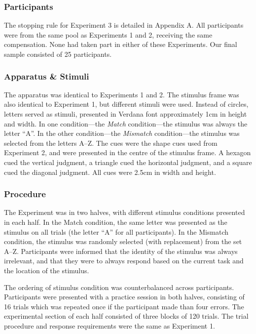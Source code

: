 \documentclass[a4paper, doc, natbib]{apa6}
\begin{document}
\subsubsection{Participants}
The stopping rule for Experiment 3 is detailed in Appendix A. All participants were from the same pool as Experiments 1 and 2, receiving the same compensation. None had taken part in either of these Experiments. Our final sample consisted of 25 participants.

\subsubsection{Apparatus \& Stimuli}
The apparatus was identical to Experiments 1 and 2. The stimulus frame was also identical to Experiment 1, but different stimuli were used. Instead of circles, letters served as stimuli, presented in Verdana font approximately 1cm in height and width. In one condition---the \emph{Match} condition---the stimulus was always the letter ``A''. In the other condition---the \emph{Mismatch} condition---the stimulus was selected from the letters A--Z. The cues were the shape cues used from Experiment 2, and were presented in the centre of the stimulus frame. A hexagon cued the vertical judgment, a triangle cued the horizontal judgment, and a square cued the diagonal judgment. All cues were 2.5cm in width and height.


\subsubsection{Procedure}
The Experiment was in two halves, with different stimulus conditions presented in each half. In the Match condition, the same letter was presented as the stimulus on all trials (the letter ``A'' for all participants). In the Mismatch condition, the stimulus was randomly selected (with replacement) from the set A--Z. Participants were informed that the identity of the stimulus was always irrelevant, and that they were to always respond based on the current task and the location of the stimulus.

The ordering of stimulus condition was counterbalanced across participants. Participants were presented with a practice session in both halves, consisting of 16 trials which was repeated once if the participant made than four errors. The experimental section of each half consisted of three blocks of 120 trials. The trial procedure and response requirements were the same as Experiment 1. 
\end{document}
